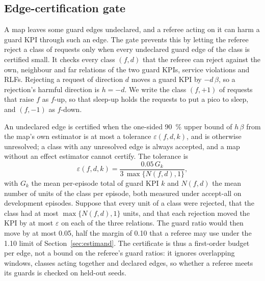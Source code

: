 \subsection{Edge-certification gate}
\label{sec:gate}

A map leaves some guard edges undeclared, and a referee acting on it can harm a guard KPI through such an edge. The
gate prevents this by letting the referee reject a class of requests only when every undeclared guard edge of the
class is certified small. It checks every class $(f, d)$ that the referee can reject against the own, neighbour and far
relations of the two guard KPIs, service violations and RLFs. Rejecting a request of direction $d$ moves a guard KPI
by $-d\,\beta$, so a rejection's harmful direction is $h = -d$. We write the class $(f, +1)$ of requests that raise $f$
as $f$-up, so that sleep-up holds the requests to put a pico to sleep, and $(f, -1)$ as $f$-down.

An undeclared edge is certified when the one-sided 90~\% upper bound of $h\,\beta$ from the map's own estimator is at
most a tolerance $\varepsilon(f, d, k)$, and is otherwise unresolved; a class with any unresolved edge is always
accepted, and a map without an effect estimator cannot certify. The tolerance is
\begin{equation}
\varepsilon(f, d, k) = \frac{0.05\, G_k}{3\, \max\{N(f, d), 1\}},
\label{eq:tol}
\end{equation}
with $G_k$ the mean per-episode total of guard KPI $k$ and $N(f, d)$ the mean number of units of the class per
episode, both measured under accept-all on development episodes. Suppose that every unit of a class were rejected,
that the class had at most $\max\{N(f, d), 1\}$ units, and that each rejection moved the KPI by at most $\varepsilon$ on
each of the three relations. The guard ratio would then move by at most 0.05, half the margin of 0.10 that a referee
may use under the 1.10 limit of Section~\ref{sec:estimand}. The certificate is thus a first-order budget per edge, not
a bound on the referee's guard ratios: it ignores overlapping windows, classes acting together and declared edges, so
whether a referee meets its guards is checked on held-out seeds.

